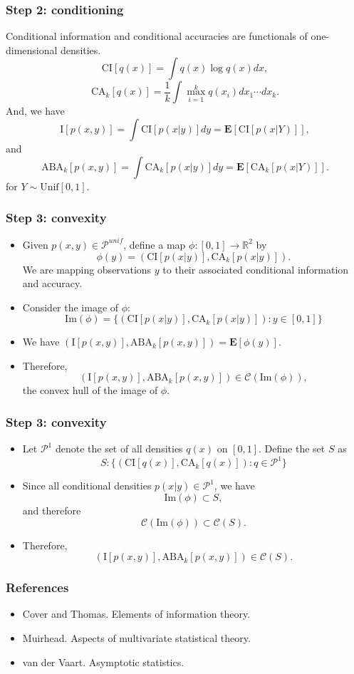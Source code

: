 \documentclass{beamer}
\newcommand{\E}{\textbf{E}}
\begin{document}
\begin{frame}
\frametitle{Step 2: conditioning}
Conditional information and conditional accuracies are functionals of one-dimensional densities.
\[
\text{CI}[q(x)] = \int q(x) \log q(x) dx,
\]
\[
\text{CA}_k[q(x)] = \frac{1}{k}\int \max_{i=1}^k q(x_i) dx_1 \cdots dx_k.
\]
And, we have
\[
\text{I}[p(x, y)] = \int \text{CI}[p(x|y)]dy = \E[\text{CI}[p(x|Y)]],
\]
and
\[
\text{ABA}_k[p(x, y)] = \int \text{CA}_k[p(x|y)]dy = \E[\text{CA}_k[p(x|Y)]].
\]
for $Y \sim \text{Unif}[0,1]$.
\end{frame}

\begin{frame}
\frametitle{Step 3: convexity}
\begin{itemize}
\item Given $p(x, y) \in \mathcal{P}^{unif}$, define a map $\phi: [0,1] \to \mathbb{R}^2$
by
\[
\phi(y) = (\text{CI}[p(x|y)], \text{CA}_k[p(x|y)]).
\]
We are mapping observations $y$ to their associated conditional information and accuracy.
\item Consider the image of $\phi$:
\[
\text{Im}(\phi) = \{(\text{CI}[p(x|y)], \text{CA}_k[p(x|y)]): y \in [0,1]\}
\]
\item We have $(\text{I}[p(x, y)], \text{ABA}_k[p(x, y)]) = \E[\phi(y)]$.
\item Therefore,
\[
(\text{I}[p(x, y)], \text{ABA}_k[p(x, y)]) \in \mathcal{C}(\text{Im}(\phi)),
\]
the convex hull of the image of $\phi$.
\end{itemize}
\end{frame}

\begin{frame}
\frametitle{Step 3: convexity}
\begin{itemize}
\item Let $\mathcal{P}^1$ denote the set of all densities $q(x)$ on $[0,1]$. Define the set $S$ as
\[
S: \{(\text{CI}[q(x)], \text{CA}_k[q(x)]): q \in \mathcal{P}^1\}
\]
\item Since all conditional densities $p(x|y) \in \mathcal{P}^1$, we have
\[
\text{Im}(\phi) \subset S,
\]
and therefore
\[
\mathcal{C}(\text{Im}(\phi)) \subset \mathcal{C}(S).
\]
\item Therefore,
\[
(\text{I}[p(x, y)], \text{ABA}_k[p(x, y)]) \in \mathcal{C}(S).
\]
\end{itemize}
\end{frame}

\begin{frame}
\frametitle{References}
\begin{itemize}
\item Cover and Thomas.  Elements of information theory.
\item Muirhead.  Aspects of multivariate statistical theory.
\item van der Vaart.  Asymptotic statistics.
\end{itemize}
\end{frame}
\end{document}
